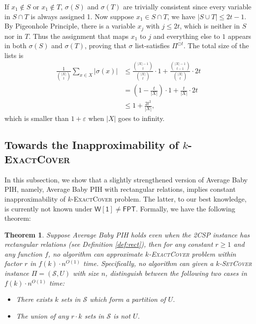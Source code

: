 \documentclass[10pt,a4paper]{article}
\newtheorem{theorem}{Theorem}
\newcommand{\wone}{\mathsf{W[1]}}
\newcommand{\fpt}{\mathsf{FPT}}
\newcommand{\kexact}{\textsc{$k$-ExactCover}}
\newcommand{\ksetcover}{\textsc{$k$-SetCover}}
\begin{document}
    If $x_1 \notin S$ or $x_1 \notin T$, $\sigma(S)$ and $\sigma(T)$ are trivially consistent since every variable in $S \cap T$ is always assigned 1. Now suppose $x_1 \in S\cap T$, we have $|S \cup T| \le 2t-1$. By Pigeonhole Principle, there is a variable $x_j$ with $j \le 2t$, which is neither in $S$ nor in $T$. Thus the assignment that maps $x_1$ to $j$ and everything else to $1$ appears in both $\sigma(S)$ and $\sigma(T)$, proving that $\sigma$ list-satisfies $\Pi^{\odot t}$. The total size of the lists is \[
    \begin{aligned}
        \frac{1}{\binom{|X|}{t}}\sum_{x \in X} |\sigma(x)| & \le \frac{\binom{|X|-1}{t}}{\binom{|X|}{t}}\cdot 1+\frac{\binom{|X|-1}{t-1}}{\binom{|X|}{t}}\cdot 2t \\ 
        & = \left(1-\frac{t}{|X|}\right)\cdot 1+\frac{t}{|X|}\cdot 2t \\
        & \le 1+\frac{2t^2}{|X|},
    \end{aligned}\]
    which is smaller than $1+\varepsilon$ when $|X|$ goes to infinity.
    

\subsection{Towards the Inapproximability of \kexact}
In this subsection, we show that a slightly strengthened version of Average Baby PIH, namely, Average Baby PIH with rectangular relations, implies constant inapproximability of \kexact{} problem. The latter, to our best knowledge, is currently not known under $\wone \neq \fpt$. Formally, we have the following theorem:

\begin{theorem}\label{thm:exactcover}
    Suppose Average Baby PIH holds even when the 2CSP instance has rectangular relations (see Definition \ref{def:rect}), then for any constant $r \ge 1$ and any function $f$, no algorithm can approximate \kexact{} problem within factor $r$ in $f(k)\cdot n^{O(1)}$ time. Specifically, no algorithm can given a \ksetcover{} instance $\Pi=(\mathcal S,U)$ with size $n$, distinguish between the following two cases in $f(k)\cdot n^{O(1)}$ time:
    \begin{itemize}
        \item There exists $k$ sets in $\mathcal S$ which form a partition of $U$.
        \item The union of any $r\cdot k$ sets in $\mathcal S$ is not $U$.
    \end{itemize}
\end{theorem}
\end{document}
